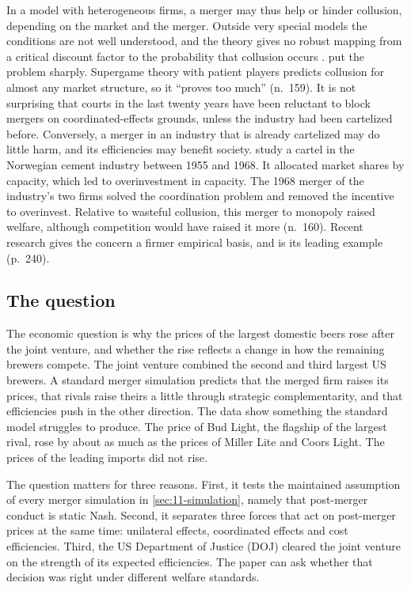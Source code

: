 In a model with heterogeneous firms, a merger may thus help or hinder collusion, depending on the market and the
merger. Outside very special models the conditions are not well understood, and the theory gives no robust mapping
from a critical discount factor to the probability that collusion occurs \citep[p.~240]{AskerNocke2021}.
\citet{KaplowShapiro2007} put the problem sharply. Supergame theory with patient players predicts collusion for
almost any market structure, so it ``proves too much'' (n.~159). It is not surprising that courts in the last twenty
years have been reluctant to block mergers on coordinated-effects grounds, unless the industry had been cartelized
before. Conversely, a merger in an industry that is already cartelized may do little harm, and its efficiencies may
benefit society. \citet{RollerSteen2006} study a cartel in the Norwegian cement industry between 1955 and 1968. It
allocated market shares by capacity, which led to overinvestment in capacity. The 1968 merger of the industry's two
firms solved the coordination problem and removed the incentive to overinvest. Relative to wasteful collusion, this
merger to monopoly raised welfare, although competition would have raised it more (n.~160). Recent research gives
the concern a firmer empirical basis, and \citet{MillerWeinberg2017} is its leading example (p.~240).

\subsection{The question}\label{sec:11-mc-question}

The economic question is why the prices of the largest domestic beers rose after the joint venture, and whether the
rise reflects a change in how the remaining brewers compete. The joint venture combined the second and third largest
US brewers. A standard merger simulation predicts that the merged firm raises its prices, that rivals raise theirs a
little through strategic complementarity, and that efficiencies push in the other direction. The data show something
the standard model struggles to produce. The price of Bud Light, the flagship of the largest rival, rose by about as
much as the prices of Miller Lite and Coors Light. The prices of the leading imports did not rise.

The question matters for three reasons. First, it tests the maintained assumption of every merger simulation in
\cref{sec:11-simulation}, namely that post-merger conduct is static Nash. Second, it separates three forces that
act on post-merger prices at the same time: unilateral effects, coordinated effects and cost efficiencies. Third,
the US Department of Justice (DOJ) cleared the joint venture on the strength of its expected efficiencies. The
paper can ask whether that decision was right under different welfare standards.

